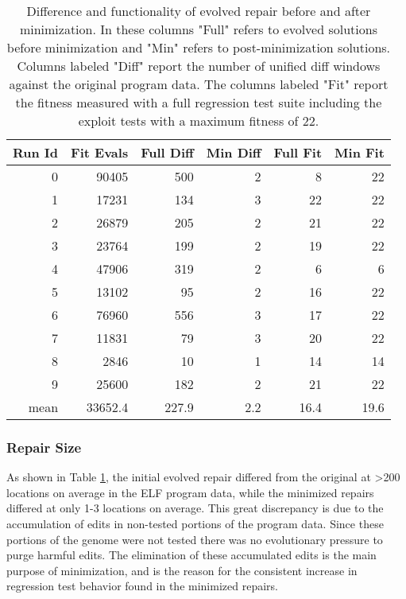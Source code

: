 \documentclass{sigcomm-alternate}
\begin{document}
\begin{table}[htb]
\centering
\begin{tabular}{rrrrrr}
Run Id & Fit Evals & Full Diff & Min Diff & Full Fit & Min Fit \\
\hline
0      & 90405     & 500       & 2        & 8        & 22      \\
1      & 17231     & 134       & 3        & 22       & 22      \\
2      & 26879     & 205       & 2        & 21       & 22      \\
3      & 23764     & 199       & 2        & 19       & 22      \\
4      & 47906     & 319       & 2        & 6        & 6       \\
5      & 13102     & 95        & 2        & 16       & 22      \\
6      & 76960     & 556       & 3        & 17       & 22      \\
7      & 11831     & 79        & 3        & 20       & 22      \\
8      & 2846      & 10        & 1        & 14       & 14      \\
9      & 25600     & 182       & 2        & 21       & 22      \\
\hline
mean   & 33652.4   & 227.9     & 2.2      & 16.4     & 19.6    \\
\end{tabular}
\caption{\label{minimized-stats}Difference and functionality of
evolved repair before and after minimization.  In these columns "Full"
refers to evolved solutions before minimization and "Min" refers to
post-minimization solutions.  Columns labeled "Diff" report the number
of unified diff windows against the original program data. The columns
labeled "Fit" report the fitness measured with a full regression test
suite including the exploit tests with a maximum fitness of 22.}
\end{table}

\subsubsection{Repair Size}
\label{sec-4-2-3}
As shown in Table \ref{minimized-stats}, the initial evolved repair differed
from the original at >200 locations on average in the ELF program
data, while the minimized repairs differed at only 1-3 locations on
average.  This great discrepancy is due to the accumulation of edits
in non-tested portions of the program data.  Since these portions of
the genome were not tested there was no evolutionary pressure to purge
harmful edits.  The elimination of these accumulated edits is the main
purpose of minimization, and is the reason for the consistent increase
in regression test behavior found in the minimized repairs.
\end{document}
